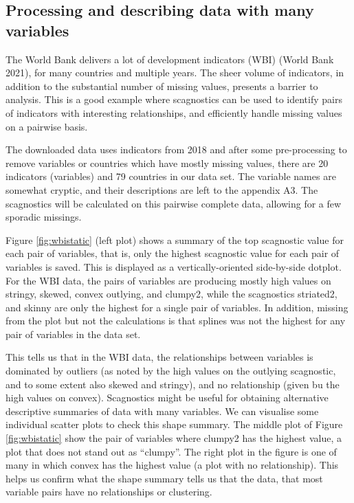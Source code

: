 \hypertarget{processing-and-describing-data-with-many-variables}{%
\subsection{Processing and describing data with many variables}\label{processing-and-describing-data-with-many-variables}}

The World Bank delivers a lot of development indicators (WBI) (World Bank 2021), for many countries and multiple years. The sheer volume of indicators, in addition to the substantial number of missing values, presents a barrier to analysis. This is a good example where scagnostics can be used to identify pairs of indicators with interesting relationships, and efficiently handle missing values on a pairwise basis.

The downloaded data uses indicators from 2018 and after some pre-processing to remove variables or countries which have mostly missing values, there are 20 indicators (variables) and 79 countries in our data set. The variable names are somewhat cryptic, and their descriptions are left to the appendix A3. The scagnostics will be calculated on this pairwise complete data, allowing for a few sporadic missings.

Figure \ref{fig:wbistatic} (left plot) shows a summary of the top scagnostic value for each pair of variables, that is, only the highest scagnostic value for each pair of variables is saved. This is displayed as a vertically-oriented side-by-side dotplot. For the WBI data, the pairs of variables are producing mostly high values on stringy, skewed, convex outlying, and clumpy2, while the scagnostics striated2, and skinny are only the highest for a single pair of variables. In addition, missing from the plot but not the calculations is that splines was not the highest for any pair of variables in the data set.

This tells us that in the WBI data, the relationships between variables is dominated by outliers (as noted by the high values on the outlying scagnostic, and to some extent also skewed and stringy), and no relationship (given bu the high values on convex). Scagnostics might be useful for obtaining alternative descriptive summaries of data with many variables. We can visualise some individual scatter plots to check this shape summary. The middle plot of Figure \ref{fig:wbistatic} show the pair of variables where clumpy2 has the highest value, a plot that does not stand out as ``clumpy''. The right plot in the figure is one of many in which convex has the highest value (a plot with no relationship). This helps us confirm what the shape summary tells us that the data, that most variable pairs have no relationships or clustering.


